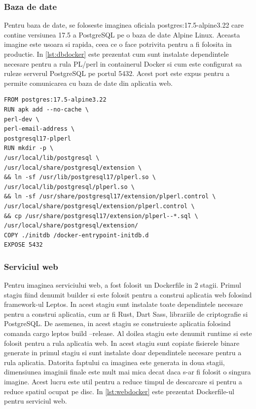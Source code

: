 \documentclass[titlepage,12pt]{article}
\DeclareRobustCommand{\code}[1]{{\ttfamily\small #1}}
\begin{document}
\subsubsection{Baza de date}
Pentru baza de date, se foloseste imaginea oficiala \code{postgres:17.5-alpine3.22} care contine versiunea 17.5 a PostgreSQL pe o baza de date Alpine Linux. Aceasta imagine este usoara si rapida, ceea ce o face potrivita pentru a fi folosita in productie. In \cref{lst:dbdocker} este prezentat cum sunt instalate dependintele necesare pentru a rula \code{PL/perl} in containerul Docker si cum este configurat sa ruleze serverul PostgreSQL pe portul 5432. Acest port este expus pentru a permite comunicarea cu baza de date din aplicatia web.

\begin{lstlisting}[language=docker,caption={Dockerfile pentru baza de date},label={lst:dbdocker}]
FROM postgres:17.5-alpine3.22
RUN apk add --no-cache \
perl-dev \
perl-email-address \
postgresql17-plperl
RUN mkdir -p \
/usr/local/lib/postgresql \
/usr/local/share/postgresql/extension \
&& ln -sf /usr/lib/postgresql17/plperl.so \
/usr/local/lib/postgresql/plperl.so \
&& ln -sf /usr/share/postgresql17/extension/plperl.control \
/usr/local/share/postgresql/extension/plperl.control \
&& cp /usr/share/postgresql17/extension/plperl--*.sql \
/usr/local/share/postgresql/extension/
COPY ./initdb /docker-entrypoint-initdb.d
EXPOSE 5432
\end{lstlisting}

\subsubsection{Serviciul web}

Pentru imaginea serviciului web, a fost folosit un Dockerfile in 2 stagii. Primul stagiu fiind denumit \code{builder} si este folosit pentru a construi aplicatia web folosind framework-ul Leptos. In acest stagiu sunt instalate toate dependintele necesare pentru a construi aplicatia, cum ar fi Rust, Dart Sass, librariile de criptografie si PostgreSQL. De asemenea, in acest stagiu se construieste aplicatia folosind comanda \code{cargo leptos build --release}. Al doilea stagiu este denumit \code{runtime} si este folosit pentru a rula aplicatia web. In acest stagiu sunt copiate fisierele binare generate in primul stagiu si sunt instalate doar dependintele necesare pentru a rula aplicatia. Datorita faptului ca imaginea este generata in doua stagii, dimensiunea imaginii finale este mult mai mica decat daca s-ar fi folosit o singura imagine. Acest lucru este util pentru a reduce timpul de descarcare si pentru a reduce spatiul ocupat pe disc. In \cref{lst:webdocker} este prezentat Dockerfile-ul pentru serviciul web.
\end{document}
